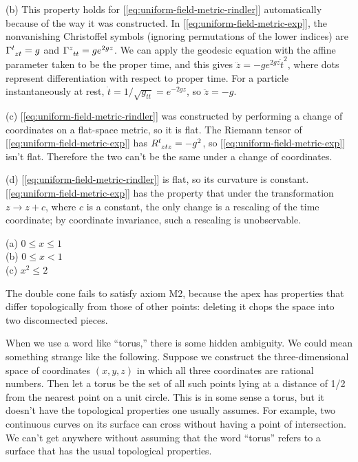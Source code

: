 (b) This property holds for [\ref{eq:uniform-field-metric-rindler}] automatically because of the way it was constructed.
In [\ref{eq:uniform-field-metric-exp}], the nonvanishing Christoffel
symbols (ignoring permutations of the lower indices) are $\Gamma\indices{^t_{zt}}=g$ and $\Gamma\indices{^z_{tt}}=ge^{2gz}$.
We can apply the geodesic equation with the affine parameter taken to be the proper time, and this gives 
$\ddot{z}=-ge^{2gz}\dot{t}^2$, where dots represent differentiation with respect to proper time.
For a particle instantaneously at rest, $\dot{t}=1/\sqrt{g_{tt}}=e^{-2gz}$, so $\ddot{z}=-g$.

(c) [\ref{eq:uniform-field-metric-rindler}] was constructed by performing a change of coordinates on a flat-space metric, so it is flat. 
The Riemann tensor of [\ref{eq:uniform-field-metric-exp}] has $R\indices{^t_{ztz}}=-g^2$, so [\ref{eq:uniform-field-metric-exp}] isn't flat.
Therefore the two can't be the same under a change of coordinates.

(d) [\ref{eq:uniform-field-metric-rindler}] is flat, so its curvature is constant. [\ref{eq:uniform-field-metric-exp}] has the
property that under the transformation $z\rightarrow z+c$, where $c$ is a constant, the only change is a rescaling of the
time coordinate; by coordinate invariance, such a rescaling is unobservable.

(a) $0 \le x \le 1$\\
(b) $0 \le x < 1$\\
(c) $x^2 \le 2$

The double cone fails to satisfy axiom M2, because the apex has properties that differ topologically from those of
other points: deleting it chops the space into two disconnected pieces.

When we use a word like ``torus,'' there is some hidden ambiguity. We could mean something strange like the following. Suppose
we construct the three-dimensional space of coordinates $(x,y,z)$ in which all three coordinates are rational numbers. Then let
a torus be the set of all such points lying at a distance of 1/2 from the nearest point on a unit circle. This is in some sense
a torus, but it doesn't have the topological properties one usually assumes. For example, two continuous curves on its surface can cross
without having a point of intersection. We can't get anywhere without assuming that the word ``torus'' refers to a surface that
has the usual topological properties.

